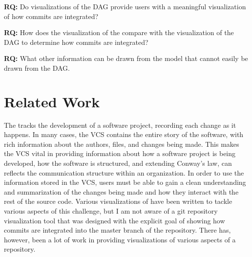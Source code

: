\begin{textbox}
  \textbf{RQ:} Do visualizations of the DAG provide
  users with a meaningful visualization of how commits are integrated?
\end{textbox}


\begin{textbox}
  \textbf{RQ:} How does the visualization of the \mt{}
  compare with the visualization of the DAG to determine how commits are
  integrated?
\end{textbox}

\begin{textbox}
  \textbf{RQ:} What other information can be drawn from the
  \mt{} model that cannot easily be drawn from the DAG.
\end{textbox}


\section{Related Work}\label{sec:related_work}

The  tracks the development of a
software project, recording each change as it happens. In many cases,
the VCS contains the entire story of the software, with rich information
about the authors, files, and changes being made. This makes the VCS
vital in providing information about how a software project is being
developed, how the software is structured, and extending Conway's law,
can reflects the communication structure within an organization. In
order to use the information stored in the VCS, users must be able to
gain a clean understanding and summarization of the changes being made
and how they interact with the rest of the source code. Various
visualizations of have been written to tackle various aspects of this
challenge, but I am not aware of a git repository visualization tool
that was designed with the explicit goal of showing how commits are
integrated into the master branch of the repository. There has, however,
been a lot of work in providing visualizations of various aspects of a
repository.

